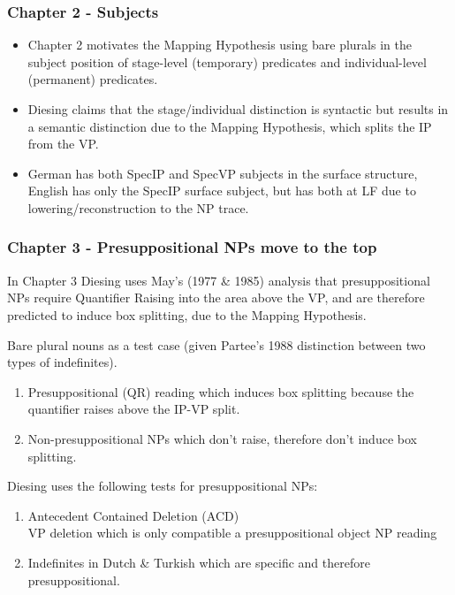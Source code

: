 \documentclass[landscape]{article}
\begin{document}
\subsubsection{Chapter 2 - Subjects}
\begin{itemize}
\item Chapter 2 motivates the Mapping Hypothesis using bare plurals in the subject position of  stage-level (temporary) predicates and individual-level   (permanent) predicates. 

\item Diesing claims that the stage/individual distinction is syntactic but results in a semantic distinction due to the Mapping Hypothesis, which splits the IP from the VP. 

\item German has both SpecIP and SpecVP subjects in the surface structure, English has only the SpecIP surface subject, but has both at LF due to lowering/reconstruction to the NP trace.
\end{itemize}
\subsubsection{Chapter 3 - Presuppositional NPs move to the top}
In Chapter 3 Diesing uses May's (1977 \& 1985) analysis that presuppositional NPs require Quantifier Raising into the area above the VP, and are therefore predicted to induce box splitting, due to the Mapping Hypothesis.
\begin{example}
Bare plural nouns as a test case (given Partee's 1988 distinction between two types of indefinites).
\begin{enumerate}
\item Presuppositional (QR) reading which induces box splitting because the quantifier raises above the IP-VP split.
\item Non-presuppositional NPs which don't raise, therefore don't induce box splitting.
\end{enumerate}
\end{example}
\begin{example}Diesing uses the following tests for presuppositional NPs:
\begin{enumerate}
\item Antecedent Contained Deletion (ACD)\\
VP deletion which is only compatible a presuppositional object NP reading
\item Indefinites in Dutch \& Turkish which are  specific and therefore presuppositional.
\end{enumerate}
\end{example}
\end{document}
